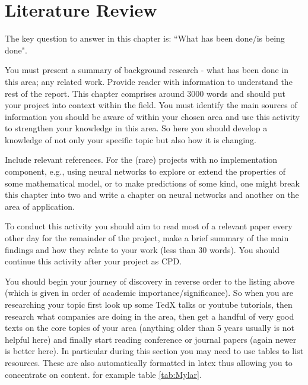\chapter{Literature Review}
\label{chap:litreview}
The key question to answer in this chapter is: ``What has been done/is being done". 

You must present a summary of background research - what has been done in this area; any related work. Provide reader with information to understand the rest of the report. This chapter comprises around 3000 words and should put your project into context within the field. You must identify the main sources of information you should be aware of within your chosen area and use this activity to strengthen your knowledge in this area. So here you should develop a knowledge of not only your specific topic but also how it is changing. 

Include relevant references. For the (rare) projects with no implementation component, e.g., using neural networks to explore or extend the properties of some mathematical model, or to make predictions of some kind, one might break this chapter into two and write a chapter on neural networks and another on the area of application.

To conduct this activity you should aim to read most of a relevant paper every other day for the remainder of the project, make a brief summary of the main findings and how they relate to your work (less than 30 words). You should continue this activity after your project as CPD.

You should begin your journey of discovery in reverse order to the listing above (which is given in order of academic importance/significance). So when you are researching your topic first look up some TedX talks or youtube tutorials, then research what companies are doing in the area, then get a handful of very good texts on the core topics of your area (anything older than 5 years usually is not helpful here) and finally start reading conference or journal papers (again newer is better here). In particular during this section you may need to use tables to list resources. These are also automatically formatted in latex thus allowing you to concentrate on content. for example table \ref{tab:Mylar}.

